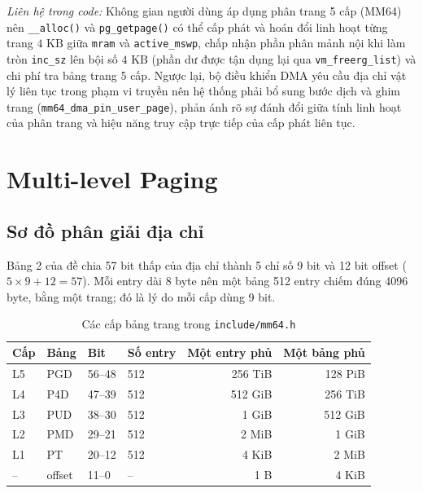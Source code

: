 \documentclass[12pt,a4paper]{article}
\begin{document}
\begin{enumerate}
        \textit{Liên hệ trong code:} Không gian người dùng áp dụng phân trang 5 cấp (MM64) nên \texttt{\_\_alloc()} và \texttt{pg\_getpage()} có thể cấp phát và hoán đổi linh hoạt từng trang $4\text{ KB}$ giữa \texttt{mram} và \texttt{active\_mswp}, chấp nhận phần phân mảnh nội khi làm tròn \texttt{inc\_sz} lên bội số $4\text{ KB}$ (phần dư được tận dụng lại qua \texttt{vm\_freerg\_list}) và chi phí tra bảng trang 5 cấp. Ngược lại, bộ điều khiển DMA yêu cầu địa chỉ vật lý liên tục trong phạm vi truyền nên hệ thống phải bổ sung bước dịch và ghim trang (\texttt{mm64\_dma\_pin\_user\_page}), phản ánh rõ sự đánh đổi giữa tính linh hoạt của phân trang và hiệu năng truy cập trực tiếp của cấp phát liên tục.
    \end{enumerate}

	\section{Multi-level Paging}

	\subsection{Sơ đồ phân giải địa chỉ}
	Bảng 2 của đề chia 57 bit thấp của địa chỉ thành 5 chỉ số 9 bit và 12 bit offset (\(5 \times 9 + 12 = 57\)). Mỗi entry dài 8 byte nên một bảng 512 entry chiếm đúng 4096 byte, bằng một trang; đó là lý do mỗi cấp dùng 9 bit.

	\begin{table}[H]
	\centering\small
	\begin{tabular}{llllrr}
	\toprule
	\textbf{Cấp} & \textbf{Bảng} & \textbf{Bit} & \textbf{Số entry} & \textbf{Một entry phủ} & \textbf{Một bảng phủ} \\
	\midrule
	L5 & PGD & 56--48 & 512 & 256 TiB & 128 PiB \\
	L4 & P4D & 47--39 & 512 & 512 GiB & 256 TiB \\
	L3 & PUD & 38--30 & 512 & 1 GiB & 512 GiB \\
	L2 & PMD & 29--21 & 512 & 2 MiB & 1 GiB \\
	L1 & PT & 20--12 & 512 & 4 KiB & 2 MiB \\
	-- & offset & 11--0 & -- & 1 B & 4 KiB \\
	\bottomrule
	\end{tabular}
	\caption{Các cấp bảng trang trong \texttt{include/mm64.h}}
	\label{tab:nhan-levels}
	\end{table}
\end{document}
